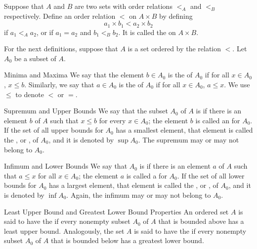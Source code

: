 \documentclass[12pt, a4paper, twoside, openright, titlepage]{book}
\begin{document}
\begin{appendices}
    \begin{defn}{}{}
        Suppose that $A$ and $B$ are two sets with order relations $<_A$ and $<_B$ respectively. Define an order relation $<$ on $A \times B$ by defining \begin{equation*}
            a_1\times b_1 < a_2\times b_2
        \end{equation*}
        if $a_1 <_A a_2$, or if $a_1 = a_2$ and $b_1 <_B b_2$. It is called the  on $A\times B$.
    \end{defn}

    
    For the next definitions, suppose that $A$ is a set ordered by the relation $<$. Let $A_0$ be a subset of $A$.


    \begin{defn}{Minima and Maxima}{}
        We say that the element $b \in A_0$ is the  of $A_0$ if for all $x \in A_0$, $x \leq b$. Similarly, we say that $a \in A_0$ is the  of $A_0$ if for all $x \in A_0$, $a \leq x$. We use $\leq$ to denote $<$ or $=$.
    \end{defn}


    \begin{defn}{Supremum and Upper Bounds}{}
        We say that the subset $A_0$ of $A$ is  if there is an element $b$ of $A$ such that $x \leq b$ for every $x \in A_0$; the element $b$ is called an  for $A_0$. If the set of all upper bounds for $A_0$ has a smallest element, that element is called the , or , of $A_0$, and it is denoted by $\sup A_0$. The supremum may or may not belong to $A_0$.
    \end{defn}


    \begin{defn}{Infimum and Lower Bounds}{}
        We say that $A_0$ is  if there is an element $a$ of $A$ such that $a \leq x$ for all $x \in A_0$; the element $a$ is called a  for $A_0$. If the set of all lower bounds for $A_0$ has a largest element, that element is called the , or , of $A_0$, and it is denoted by $\inf A_0$. Again, the infimum may or may not belong to $A_0$.
    \end{defn}


    \begin{defn}{Least Upper Bound and Greatest Lower Bound Properties}{}
        An ordered set $A$ is said to have the  if every nonempty subset $A_0$ of $A$ that is bounded above has a least upper bound. Analogously, the set $A$ is said to have the  if every nonempty subset $A_0$ of $A$ that is bounded below has a greatest lower bound. 


\end{defn}
\end{appendices}
\end{document}

